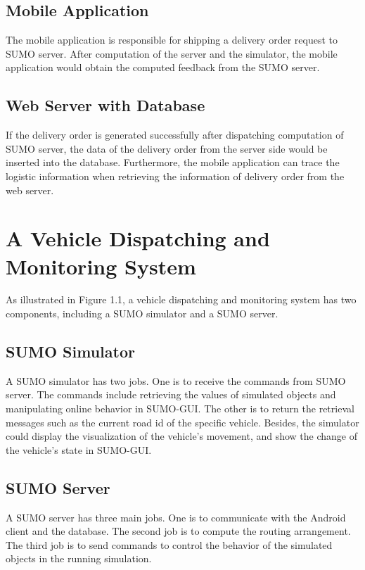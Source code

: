 \documentclass[12pt]{ksthesis}
\begin{document}
\begin{thesis}
{\subsection{Mobile Application}
The mobile application is responsible for shipping a delivery order request to SUMO server. After computation of the server and the simulator, the mobile application would obtain the computed feedback from the SUMO server.

\subsection{Web Server with Database}
If the delivery order is generated successfully after dispatching computation of SUMO server, the data of the delivery order from the server side would be inserted into the database. Furthermore, the mobile application can trace the logistic information when retrieving the information of delivery order from the web server.

\section{A Vehicle Dispatching and Monitoring System}
As illustrated in Figure 1.1, a vehicle dispatching and monitoring system has two components, including a SUMO simulator and a SUMO server.



\subsection{SUMO Simulator}
A SUMO simulator has two jobs. One is to receive the commands from SUMO server. The commands include retrieving the values of simulated objects and manipulating online behavior in SUMO-GUI. The other is to return the retrieval messages such as the current road id of the specific vehicle. Besides, the simulator could display the visualization of the vehicle’s movement, and show the change of the vehicle’s state in SUMO-GUI.

\subsection{SUMO Server}
A SUMO server has three main jobs. One is to communicate with the Android client and the database. The second job is to compute the routing arrangement. The third job is to send commands to control the behavior of the simulated objects in the running simulation.

}
\end{thesis}
\end{document}
